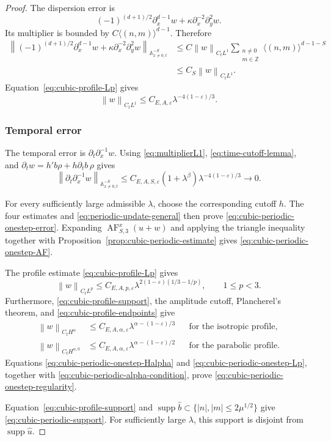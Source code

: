 \documentclass[12pt,reqno,letterpaper]{amsart}
\numberwithin{equation}{section}
\theoremstyle{definition}
\newcommand{\Z}{\mathbb Z}
\newcommand{\A}{\mathbb A}
\newcommand{\eps}{\varepsilon}
\newcommand{\la}{\lambda}
\newcommand{\supp}{\operatorname{supp}}
\newcommand{\norm}[1]{\left\lVert #1\right\rVert}
\newcommand{\abs}[1]{\left\lvert #1\right\rvert}
\begin{document}
\begin{proof}
The dispersion error is
\[
 (-1)^{(d+1)/2}\partial_x^{d-1}w
 +\kappa\partial_x^{-2}\partial_y^2w.
\]
Its multiplier is bounded by
$C\langle(n,m)\rangle^{d-1}$.  Therefore
\begin{align*}
 \norm{(-1)^{(d+1)/2}\partial_x^{d-1}w+
  \kappa\partial_x^{-2}\partial_y^2w}
       _{\A^{-S}_{x\neq0,t}}
 &\leq C\norm w_{C_tL^1}
 \sum_{\substack{n\neq0\\m\in\Z}}
   \langle(n,m)\rangle^{d-1-S}\\
 &\leq C_{S}\norm w_{C_tL^1}.
\end{align*}
Equation~\eqref{eq:cubic-profile-Lp} gives
\[
 \norm w_{C_tL^1}
 \leq C_{E,A,\eps}
 \la^{-4(1-\eps)/3}.
\]
\subsubsection*{Temporal error}

The temporal error is $\partial_t\partial_x^{-1}w$.  Using
\eqref{eq:multiplierL1}, \eqref{eq:time-cutoff-lemma}, and
$\partial_tw=h'b\rho+h\partial_tb\,\rho$ gives
\begin{equation*}
 \norm{\partial_t\partial_x^{-1}w}_{\A^{-S}_{x\neq0,t}}
 \leq C_{E,A,S,\eps}(1+\la^\beta)
 \la^{-4(1-\eps)/3}\longrightarrow0.
\end{equation*}

For every sufficiently large admissible $\la$, choose the corresponding
cutoff $h$.  The four estimates and \eqref{eq:periodic-update-general}
then prove \eqref{eq:cubic-periodic-onestep-error}.  Expanding
$\operatorname{AF}_{S,3}^x(u+w)$ and applying the triangle inequality
together with Proposition~\ref{prop:cubic-periodic-estimate} gives
\eqref{eq:cubic-periodic-onestep-AF}.

The profile estimate \eqref{eq:cubic-profile-Lp} gives
\begin{equation}\label{eq:cubic-periodic-onestep-Lp}
 \norm w_{C_tL^p}
 \leq C_{E,A,p,\eps}
 \la^{2(1-\eps)(1/3-1/p)},
 \qquad1\leq p<3.
\end{equation}
Furthermore, \eqref{eq:cubic-profile-support}, the amplitude cutoff,
Plancherel's theorem, and \eqref{eq:cubic-profile-endpoints} give
\begin{equation}\label{eq:cubic-periodic-onestep-Halpha}
 \begin{aligned}
 \norm w_{C_tH^\alpha}
 &\leq C_{E,A,\alpha,\eps}
 \la^{\alpha-(1-\eps)/3}
 &&\text{for the isotropic profile},\\
 \norm w_{C_tH^{\alpha,0}}
 &\leq C_{E,A,\alpha,\eps}
 \la^{\alpha-(1-\eps)/2}
 &&\text{for the parabolic profile}.
 \end{aligned}
\end{equation}
Equations \eqref{eq:cubic-periodic-onestep-Halpha} and
\eqref{eq:cubic-periodic-onestep-Lp}, together with
\eqref{eq:cubic-periodic-alpha-condition}, prove
\eqref{eq:cubic-periodic-onestep-regularity}.

Equation~\eqref{eq:cubic-profile-support} and $\supp\widehat b\subset
\{\abs n,\abs m\leq2\mu^{1/2}\}$ give
\eqref{eq:cubic-periodic-support}.  For sufficiently large $\la$, this
support is disjoint from $\supp\widehat u$.
\end{proof}
\end{document}
